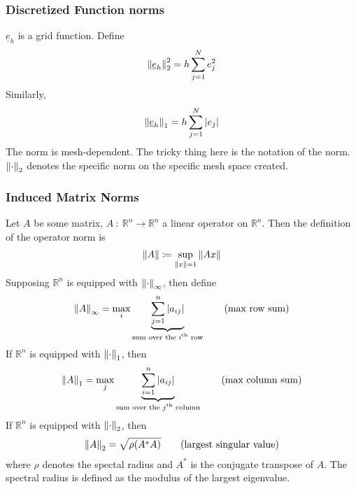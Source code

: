 \documentclass{article}
\newcommand{\Rl}{\mathbb{R}}
\newcommand{\f}[3]{#1\ :\ #2 \rightarrow #3}
\begin{document}
            \subsubsection{Discretized Function norms}
                $\underline{e}_h$ is a grid function.  Define
                \begin{align}
                    \norm{\underline{e}_h}_2^2 = h\sum_{j=1}^N e_j^2
                \end{align}
                Similarly,
                \begin{align}
                    \norm{\underline{e}_h}_1 = h \sum_{j=1}^N\abs{e_j}
                \end{align}
                The norm is mesh-dependent.  The tricky thing here is the notation of the norm.  $\norm{\cdot}_2$ denotes the specific norm on the specific mesh space created.
            \subsubsection{Induced Matrix Norms}
                Let $A$ be some matrix, $\f{A}{\Rl^n}{\Rl^n}$ a linear operator on $\Rl^n$.  Then the definition of the operator norm is
                \begin{align}
                    \norm{A} \coloneqq \sup_{\norm{x} = 1} \norm{Ax}
                \end{align}
                Supposing $\Rl^n$ is equipped with $\norm{\cdot}_\infty$, then define
                \begin{align}
                    \norm{A}_\infty = \max_i \underbrace{\sum_{j=1}^n \abs{a_{ij}}}_{\text{sum over the $i$\textsuperscript{th} row}} \qquad \text{(max row sum)} \\
                \end{align}
                If $\Rl^n$ is equipped with $\norm{\cdot}_1$, then
                \begin{align}
                    \norm{A}_1 = \max_j \underbrace{\sum_{i=1}^n \abs{a_{ij}}}_{\text{sum over the $j$\textsuperscript{th} column}} \qquad \text{(max column sum)} \\
                \end{align}
                If $\Rl^n$ is equipped with $\norm{\cdot}_2$, then
                \begin{align}
                    \norm{A}_2 = \sqrt{\rho(A^*A)} \qquad \text{(largest singular value)}
                \end{align}
                where $\rho$ denotes the spectal radius and $A^*$ is the conjugate transpose of $A$.  The spectral radius is defined as the modulus of the largest eigenvalue.
\end{document}
